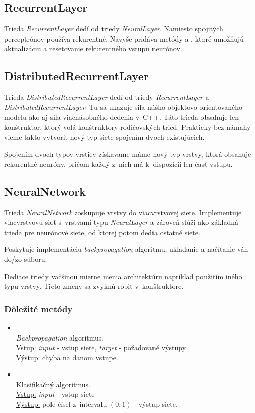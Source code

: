 \subsection{RecurrentLayer}
Trieda \textit{RecurrentLayer} dedí od triedy \textit{NeuralLayer}. Namiesto spojitých perceptrónov používa rekurentné. Navyše pridáva metódy  a , ktoré umožňujú aktualizáciu a resetovanie rekurentného vstupu neurónov.

\subsection{DistributedRecurrentLayer}
Trieda \textit{DistributedRecurrentLayer} dedí od triedy \textit{RecurrentLayer} a \textit{DistributedRecurrentLayer}. Tu sa ukazuje sila nášho objektovo orientovaného modelu ako aj sila viacnásobného dedenia v~C++. Táto trieda obsahuje len konštruktor, ktorý volá konštruktory rodičovských tried. Prakticky bez námahy vieme takto vytvoriť nový typ siete spojením dvoch existujúcich.

Spojením dvoch typov vrstiev získavame máme nový typ vrstvy, ktorá obsahuje rekurentné neuróny, pričom každý z~nich má k~dispozícii len časť vstupu.

\subsection{NeuralNetwork}
Trieda \textit{NeuralNetwork} zoskupuje vrstvy do viacvrstvovej siete. Implementuje viacvrstvovú sieť s~vrstvami typu \textit{NeuralLayer} a zároveň slúži ako základná trieda pre neurónové siete, od ktorej potom dedia ostatné siete.

Poskytuje implementáciu \textit{backpropagation} algoritmu, ukladanie a načítanie váh do/zo súboru. 

Dediace triedy väčšinou mierne menia architektúru napríklad použitím iného typu vrstvy. Tieto zmeny sa zvyknú robiť v~konštruktore.

\subsubsection{Dôležité metódy}
\begin{itemize}
\item {}
\\\textit{Backpropagation} algoritmus.
\\ \underline{Vstup:} \textit{input} - vstup siete, \textit{target} - požadované výstupy 
\\ \underline{Výstup:} chyba na danom vstupe.
\item {}
\\ Klasifikačný algoritmus.
\\ \underline{Vstup:} \textit{input} - vstup siete
\\ \underline{Výstup:} pole čísel z~intervalu $(0,1)$ - výstup siete.
\end{itemize}


